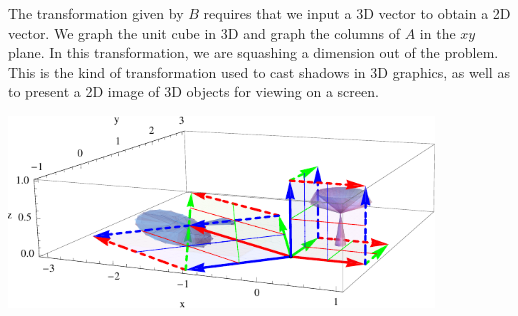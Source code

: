 \begin{example}
The transformation given by $B$ requires that we input a 3D vector to obtain a 2D vector.  We graph the unit cube in 3D and graph the columns of $A$ in the $xy$ plane. In this transformation, we are squashing a dimension out of the problem. This is the kind of transformation used to cast shadows in 3D graphics, as well as to present a 2D image of 3D objects for viewing on a screen. 
\begin{center}
\includegraphics[height=2in]{04-Linear-Transformations/support/LT3dto2d}
\end{center}


\end{example}


